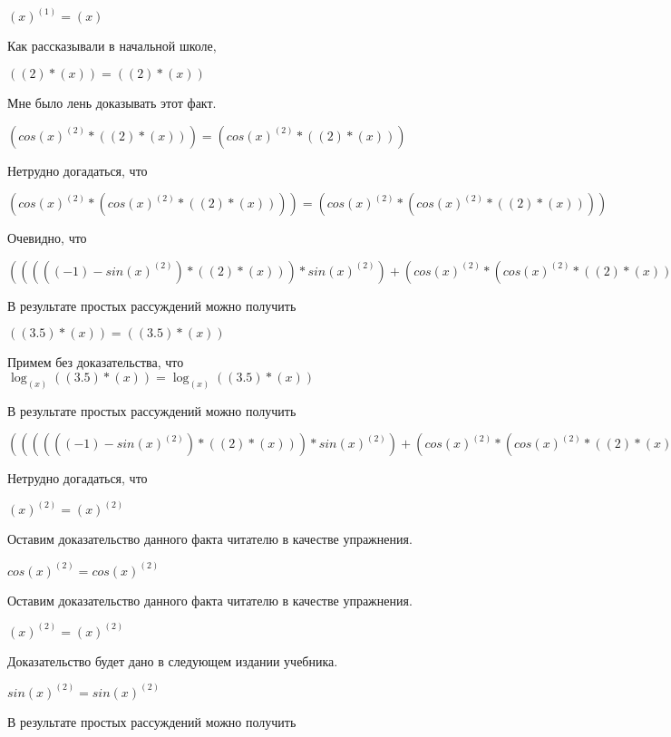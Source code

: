 \documentclass[12pt,a4paper,fleqn]{article}
\theoremstyle{definition}
\begin{document}
${( x )}^{( 1 )} = ( x )$

Как рассказывали в начальной школе,

$(( 2 ) * ( x )) = (( 2 ) * ( x ))$

Мне было лень доказывать этот факт.

$(cos{( x )}^{( 2 )} * (( 2 ) * ( x ))) = (cos{( x )}^{( 2 )} * (( 2 ) * ( x )))$

Нетрудно догадаться, что

$(cos{( x )}^{( 2 )} * (cos{( x )}^{( 2 )} * (( 2 ) * ( x )))) = (cos{( x )}^{( 2 )} * (cos{( x )}^{( 2 )} * (( 2 ) * ( x ))))$

Очевидно, что

$((((( -1 ) - sin{( x )}^{( 2 )}) * (( 2 ) * ( x ))) * sin{( x )}^{( 2 )}) + (cos{( x )}^{( 2 )} * (cos{( x )}^{( 2 )} * (( 2 ) * ( x ))))) = ((((( -1 ) - sin{( x )}^{( 2 )}) * (( 2 ) * ( x ))) * sin{( x )}^{( 2 )}) + (cos{( x )}^{( 2 )} * (cos{( x )}^{( 2 )} * (( 2 ) * ( x )))))$

В результате простых рассуждений можно получить

$(( 3.5 ) * ( x )) = (( 3.5 ) * ( x ))$

Примем без доказательства, что
$\log_{( x )}{(( 3.5 ) * ( x ))} = \log_{( x )}{(( 3.5 ) * ( x ))}$

В результате простых рассуждений можно получить

$(((((( -1 ) - sin{( x )}^{( 2 )}) * (( 2 ) * ( x ))) * sin{( x )}^{( 2 )}) + (cos{( x )}^{( 2 )} * (cos{( x )}^{( 2 )} * (( 2 ) * ( x ))))) * \log_{( x )}{(( 3.5 ) * ( x ))}) = (((((( -1 ) - sin{( x )}^{( 2 )}) * (( 2 ) * ( x ))) * sin{( x )}^{( 2 )}) + (cos{( x )}^{( 2 )} * (cos{( x )}^{( 2 )} * (( 2 ) * ( x ))))) * \log_{( x )}{(( 3.5 ) * ( x ))})$

Нетрудно догадаться, что

${( x )}^{( 2 )} = {( x )}^{( 2 )}$

Оставим доказательство данного факта читателю в качестве упражнения.

$cos{( x )}^{( 2 )} = cos{( x )}^{( 2 )}$

Оставим доказательство данного факта читателю в качестве упражнения.

${( x )}^{( 2 )} = {( x )}^{( 2 )}$

Доказательство будет дано в следующем издании учебника.

$sin{( x )}^{( 2 )} = sin{( x )}^{( 2 )}$

В результате простых рассуждений можно получить
\end{document}
